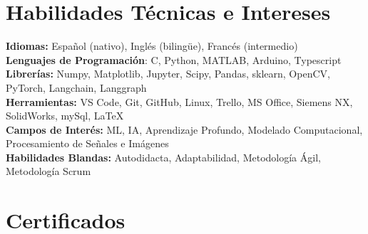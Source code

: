 \documentclass{resume}
\begin{document}
    \section{\textbf{Habilidades Técnicas e Intereses}} \label{sec:skills}
    \begin{itemize}[leftmargin=0.05in, label={}]
        \small{\item{
            \textbf{Idiomas:}{ Español (nativo), Inglés (bilingüe}), Francés (intermedio) } \\
        \textbf{Lenguajes de Programación}{: C, Python, MATLAB, Arduino, Typescript } \\
        \textbf{Librerías:}{ Numpy, Matplotlib, Jupyter, Scipy, Pandas, sklearn, OpenCV, PyTorch, Langchain, Langgraph}\\
        \textbf{Herramientas:}{ VS Code, Git, GitHub, Linux, Trello, MS Office, Siemens NX, SolidWorks, mySql,
            \LaTeX} \\
        \textbf{Campos de Interés:}
        {ML, IA, Aprendizaje Profundo, Modelado Computacional, Procesamiento de Señales e Imágenes} \\
        \textbf{Habilidades Blandas:}{ Autodidacta, Adaptabilidad, Metodología Ágil, Metodología Scrum} \\
        }
    \end{itemize}




    \section{\textbf{Certificados}} \label{sec:certifications}
    \vspace{-0.4mm}
    \resumeSubHeadingListStart






    \resumeSubHeadingListEnd


\end{document}
